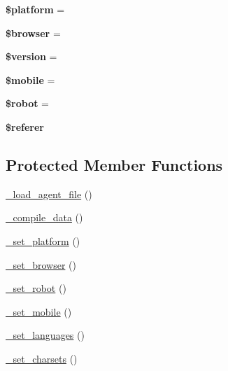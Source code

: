 \begin{DoxyCompactItemize}
{\bfseries \$platform} = \textquotesingle{}\textquotesingle{}
\item 
\mbox{\label{class_c_i___user__agent_acc085707ab7521327aebcf8d188fe149}} 
{\bfseries \$browser} = \textquotesingle{}\textquotesingle{}
\item 
\mbox{\label{class_c_i___user__agent_a8832e20362377d65ec19cd3571a5e5a2}} 
{\bfseries \$version} = \textquotesingle{}\textquotesingle{}
\item 
\mbox{\label{class_c_i___user__agent_abd4b5f717e6269ffe28a20ed7ee2b5b1}} 
{\bfseries \$mobile} = \textquotesingle{}\textquotesingle{}
\item 
\mbox{\label{class_c_i___user__agent_a0cc2a48a0650844cec65fd7c7884073c}} 
{\bfseries \$robot} = \textquotesingle{}\textquotesingle{}
\item 
\mbox{\label{class_c_i___user__agent_a39304a29bbf4ec0319b1a7d5678ec499}} 
{\bfseries \$referer}
\end{DoxyCompactItemize}
\subsection*{Protected Member Functions}
\begin{DoxyCompactItemize}
\item 
\mbox{\hyperlink{class_c_i___user__agent_a83b02aa6ab8574e24f99d7454fe83d40}{\+\_\+load\+\_\+agent\+\_\+file}} ()
\item 
\mbox{\hyperlink{class_c_i___user__agent_a0ddc8e870077a0e9fa535b31fe8e91fb}{\+\_\+compile\+\_\+data}} ()
\item 
\mbox{\hyperlink{class_c_i___user__agent_a5e867289ca27950ab84c9919c5ed9fff}{\+\_\+set\+\_\+platform}} ()
\item 
\mbox{\hyperlink{class_c_i___user__agent_ae2ee637f9a6a29b7e0a88dc49d1c7121}{\+\_\+set\+\_\+browser}} ()
\item 
\mbox{\hyperlink{class_c_i___user__agent_a86a4fec77f1169589bc1094f48847e15}{\+\_\+set\+\_\+robot}} ()
\item 
\mbox{\hyperlink{class_c_i___user__agent_aa0d36a9af99e7ec22e57ea30c7a97cb4}{\+\_\+set\+\_\+mobile}} ()
\item 
\mbox{\hyperlink{class_c_i___user__agent_aa08de592d3ee8dec25aa869789b19964}{\+\_\+set\+\_\+languages}} ()
\item 
\mbox{\hyperlink{class_c_i___user__agent_abcf376179db0b043e06cd1a944085d12}{\+\_\+set\+\_\+charsets}} ()
\end{DoxyCompactItemize}


